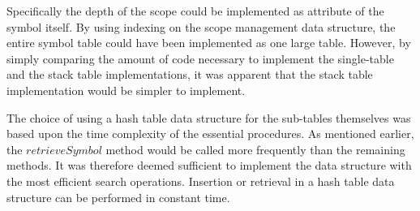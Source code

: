 Specifically the depth of the scope could be implemented as attribute of the symbol itself.
By using indexing on the scope management data structure, the entire symbol table could have been implemented as one large table.
However, by simply comparing the amount of code necessary to implement the single-table and the stack table implementations, it was apparent that the stack table implementation would be simpler to implement.

The choice of using a hash table data structure for the sub-tables themselves was based upon the time complexity of the essential procedures.
As mentioned earlier, the $retrieveSymbol$ method would be called more frequently than the remaining methods.
It was therefore deemed sufficient to implement the data structure with the most efficient search operations.
Insertion or retrieval in a hash table data structure can be performed in constant time.
